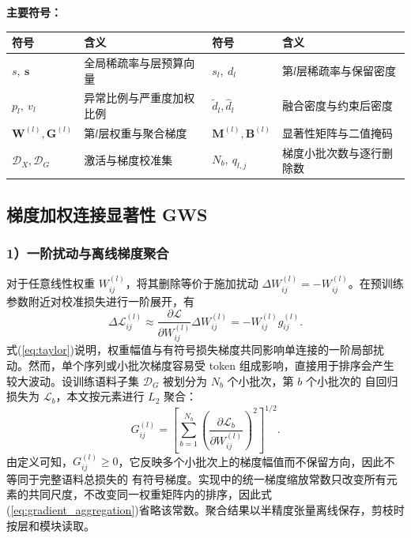 \documentclass[UTF8,fontset=fandol]{ctexart}
\renewcommand{\arraystretch}{1.08}
\begin{document}
\noindent\textbf{主要符号：}\par
\begin{center}
\footnotesize
\setlength{\tabcolsep}{3.2pt}
\renewcommand{\arraystretch}{0.96}
\begin{tabular}{p{}p{}p{}p{}}
\toprule
符号 & 含义 & 符号 & 含义 \\
\midrule
$s,\ \bm s$ & 全局稀疏率与层预算向量 & $s_l,\ d_l$ & 第$l$层稀疏率与保留密度 \\
$p_l,\ v_l$ & 异常比例与严重度加权比例 & $\widetilde d_l,\widehat d_l$ & 融合密度与约束后密度 \\
$\bm W^{(l)},\bm G^{(l)}$ & 第$l$层权重与聚合梯度 & $\bm M^{(l)},\bm B^{(l)}$ & 显著性矩阵与二值掩码 \\
$\mathcal D_X,\mathcal D_G$ & 激活与梯度校准集 & $N_b,\ q_{l,j}$ & 梯度小批次数与逐行删除数 \\
\bottomrule
\end{tabular}
\end{center}

\subsection{梯度加权连接显著性 GWS}

\subsubsection*{1）一阶扰动与离线梯度聚合}

对于任意线性权重 $W_{ij}^{(l)}$，将其删除等价于施加扰动
$\Delta W_{ij}^{(l)}=-W_{ij}^{(l)}$。在预训练参数附近对校准损失进行一阶展开，有
\begin{equation}
\Delta\mathcal L_{ij}^{(l)}
\approx
\frac{\partial\mathcal L}{\partial W_{ij}^{(l)}}
\Delta W_{ij}^{(l)}
=-W_{ij}^{(l)}g_{ij}^{(l)} .
\label{eq:taylor}
\end{equation}
式(\ref{eq:taylor})说明，权重幅值与有符号损失梯度共同影响单连接的一阶局部扰动。然而，单个序列或小批次梯度容易受
token 组成影响，直接用于排序会产生较大波动。设训练语料子集 $\mathcal D_G$ 被划分为 $N_b$ 个小批次，第 $b$ 个小批次的
自回归损失为 $\mathcal L_b$，本文按元素进行 $L_2$ 聚合：
\begin{equation}
G_{ij}^{(l)}
=
\left[
\sum_{b=1}^{N_b}
\left(
\frac{\partial\mathcal L_b}{\partial W_{ij}^{(l)}}
\right)^2
\right]^{1/2}.
\label{eq:gradient_aggregation}
\end{equation}
由定义可知，$G_{ij}^{(l)}\geq0$，它反映多个小批次上的梯度幅值而不保留方向，因此不等同于完整语料总损失的
有符号梯度。实现中的统一梯度缩放常数只改变所有元素的共同尺度，不改变同一权重矩阵内的排序，因此式
(\ref{eq:gradient_aggregation})省略该常数。聚合结果以半精度张量离线保存，剪枝时按层和模块读取。
\end{document}
